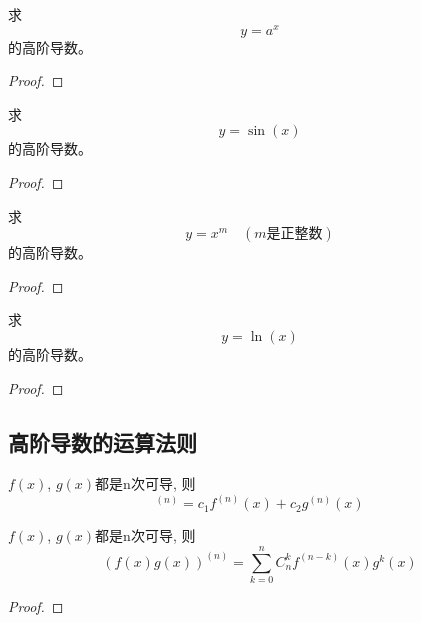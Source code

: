 \begin{example}
    求
    \begin{equation*}
        y = a^x
    \end{equation*}
    的高阶导数。
\end{example}
\begin{proof}
    
\end{proof}

\begin{example}
    求
    \begin{equation*}
        y = \sin(x)
    \end{equation*}
    的高阶导数。
\end{example}
\begin{proof}
    
\end{proof}

\begin{example}
    求
    \begin{equation*}
        y = x^m \quad (m\text{是正整数})
    \end{equation*}
    的高阶导数。
\end{example}
\begin{proof}
    
\end{proof}
\begin{example}
    求
    \begin{equation*}
        y = \ln(x)
    \end{equation*}
    的高阶导数。
\end{example}
\begin{proof}
    
\end{proof}
\subsection{高阶导数的运算法则}
\begin{theorem}
    $f(x)$, $g(x)$都是n次可导, 则
    \begin{equation*}
        [c_1f(x)+c_2g(x)]^{(n)} = c_1f^{(n)}(x)+c_2g^{(n)}(x)
    \end{equation*}
\end{theorem}

\begin{theorem}[Leibniz公式]
    $f(x)$, $g(x)$都是n次可导, 则
    \begin{equation*}
        (f(x)g(x))^{(n)} = \sum_{k=0}^{n}C_n^kf^{(n-k)}(x)g^{k}(x)
    \end{equation*}
\end{theorem}
\begin{proof}
    
\end{proof}

